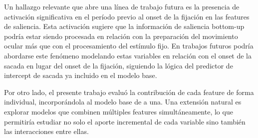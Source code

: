 Un hallazgo relevante que abre una línea de trabajo futura es la presencia de activación significativa en el período previo al onset de la fijación en las features de saliencia. Esta activación  sugiere que la información de saliencia bottom-up podría estar siendo procesada en relación con la preparación del movimiento ocular más que con el procesamiento del estímulo fijo. En trabajos futuros podría abordarse este fenómeno modelando estas variables en relación con el onset de la sacada en lugar del onset de la fijación, siguiendo la lógica del predictor de intercept de sacada ya incluido en el modelo base.

Por otro lado, el presente trabajo evaluó la contribución de cada feature de forma individual, incorporándola al modelo base de a una. Una extensión natural es explorar modelos que combinen múltiples features simultáneamente, lo que permitiría estudiar no solo el aporte incremental de cada variable sino también las interacciones entre ellas.